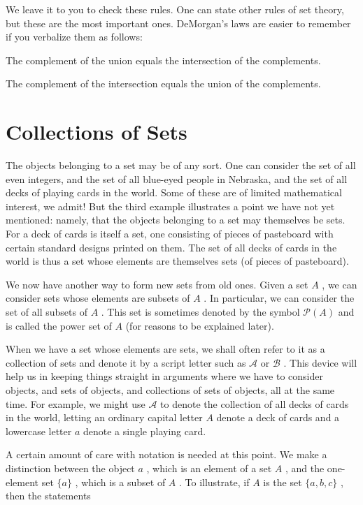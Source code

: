 We leave it to you to check these rules. One can state other rules of set theory, but these are the most important ones. DeMorgan's laws are easier to remember if you verbalize them as follows:

The complement of the union equals the intersection of the complements.

The complement of the intersection equals the union of the complements.

\section*{Collections of Sets}

The objects belonging to a set may be of any sort. One can consider the set of all even integers, and the set of all blue-eyed people in Nebraska, and the set of all decks of playing cards in the world. Some of these are of limited mathematical interest, we admit! But the third example illustrates a point we have not yet mentioned: namely, that the objects belonging to a set may themselves be sets. For a deck of cards is itself a set, one consisting of pieces of pasteboard with certain standard designs printed on them. The set of all decks of cards in the world is thus a set whose elements are themselves sets (of pieces of pasteboard).

We now have another way to form new sets from old ones. Given a set \(A\) , we can consider sets whose elements are subsets of \(A\) . In particular, we can consider the set of all subsets of \(A\) . This set is sometimes denoted by the symbol \(\mathcal{P}\left( A\right)\) and is called the power set of \(A\) (for reasons to be explained later).

When we have a set whose elements are sets, we shall often refer to it as a collection of sets and denote it by a script letter such as \(\mathcal{A}\) or \(\mathcal{B}\) . This device will help us in keeping things straight in arguments where we have to consider objects, and sets of objects, and collections of sets of objects, all at the same time. For example, we might use \(\mathcal{A}\) to denote the collection of all decks of cards in the world, letting an ordinary capital letter \(A\) denote a deck of cards and a lowercase letter \(a\) denote a single playing card.

A certain amount of care with notation is needed at this point. We make a distinction between the object \(a\) , which is an element of a set \(A\) , and the one-element set \(\{ a\}\) , which is a subset of \(A\) . To illustrate, if \(A\) is the set \(\{ a,b,c\}\) , then the statements

